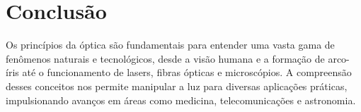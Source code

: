 \documentclass{article}
\begin{document}
\section{Conclusão}

Os princípios da óptica são fundamentais para entender uma vasta gama de fenômenos naturais e tecnológicos, desde a visão humana e a formação de arco-íris até o funcionamento de lasers, fibras ópticas e microscópios. A compreensão desses conceitos nos permite manipular a luz para diversas aplicações práticas, impulsionando avanços em áreas como medicina, telecomunicações e astronomia.
\end{document}
